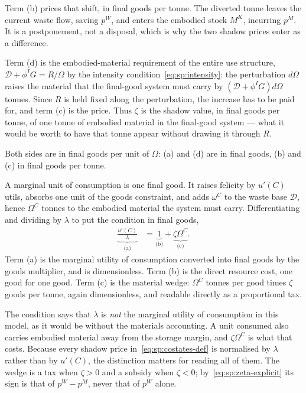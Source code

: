 Term (b) prices that shift, in final goods per tonne. The diverted tonne leaves the current waste flow, saving $p^W$, and enters the embodied stock $M^K$, incurring $p^M$. It is a postponement, not a disposal, which is why the two shadow prices enter as a difference.

Term (d) is the embodied-material requirement of the entire use structure, $\mathcal D+\phi^IG=R/\Omega$ by the intensity condition~\eqref{eq:sp:intensity}: the perturbation $d\Omega$ raises the material that the final-good system must carry by $\left(\mathcal D+\phi^IG\right)d\Omega$ tonnes. Since $R$ is held fixed along the perturbation, the increase has to be paid for, and term (c) is the price. Thus $\zeta$ is the shadow value, in final goods per tonne, of one tonne of embodied material in the final-good system --- what it would be worth to have that tonne appear without drawing it through $R$.

Both sides are in final goods per unit of $\Omega$: (a) and (d) are in final goods, (b) and (c) in final goods per tonne.

 A marginal unit of consumption is one final good. It raises felicity by $u'\left(C\right)$ utils, absorbs one unit of the goods constraint, and adds $\omega^C$ to the waste base $\mathcal D$, hence $\Omega^C$ tonnes to the embodied material the system must carry. Differentiating and dividing by $\lambda$ to put the condition in final goods,
\begin{align}
\underbrace{\frac{u'\left(C\right)}{\lambda}}_{\text{(a)}} &= \underbrace{1}_{\text{(b)}}+\underbrace{\zeta\Omega^C}_{\text{(c)}} .
\label{eq:sp:foc:C}
\end{align}
Term (a) is the marginal utility of consumption converted into final goods by the goods multiplier, and is dimensionless. Term (b) is the direct resource cost, one good for one good. Term (c) is the material wedge: $\Omega^C$ tonnes per good times $\zeta$ goods per tonne, again dimensionless, and readable directly as a proportional tax.

The condition says that $\lambda$ is \emph{not} the marginal utility of consumption in this model, as it would be without the materials accounting. A unit consumed also carries embodied material away from the storage margin, and $\zeta\Omega^C$ is what that costs. Because every shadow price in~\eqref{eq:sp:costates-def} is normalised by $\lambda$ rather than by $u'\left(C\right)$, the distinction matters for reading all of them. The wedge is a tax when $\zeta>0$ and a subsidy when $\zeta<0$; by~\eqref{eq:sp:zeta-explicit} its sign is that of $p^W-p^M$, never that of $p^W$ alone.

